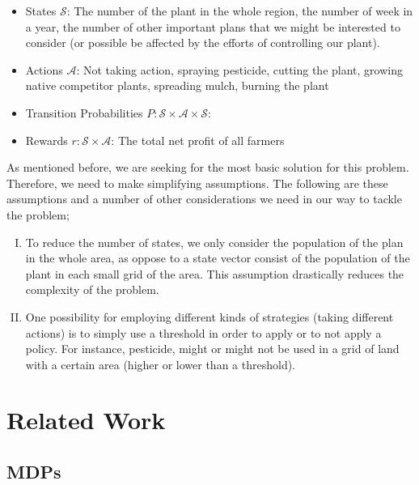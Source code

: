 \documentclass{article}
\theoremstyle{remark}
\theoremstyle{remark}
\theoremstyle{remark}
\theoremstyle{remark}
\theoremstyle{remark}
\theoremstyle{remark}
\begin{document}
\begin{itemize}
 \item States $\mathcal{S}$: The number of the plant in the whole region, the number of week in a year, the number of other important plans that we might be interested to consider (or possible be affected by the efforts of controlling our plant).
 \item Actions $\mathcal{A}$: Not taking action, spraying pesticide, cutting the plant, growing native competitor plants, spreading mulch, burning the plant
 \item Transition Probabilities $P: \mathcal{S} \times \mathcal{A} \times \mathcal{S}$:
 \item Rewards $r: \mathcal{S} \times \mathcal{A}$: The total net profit of all farmers
\end{itemize}

As mentioned before, we are seeking for the most basic solution for this problem. Therefore, we need to make simplifying assumptions. The following are these assumptions and a number of other considerations we need in our way to tackle the problem;

\begin{enumerate}[(I)]
 \item To reduce the number of states, we only consider the population of the plan in the whole area, as oppose to a state vector consist of the population of the plant in each small grid of the area. This assumption drastically reduces the complexity of the problem.
 \item One possibility for employing different kinds of strategies (taking different actions) is to simply use a threshold in order to apply or to not apply a policy. For instance, pesticide, might or might not be used in a grid of land with a certain area (higher or lower than a threshold).
\end{enumerate}

\section{Related Work}

\subsection{MDPs}
\end{document}
